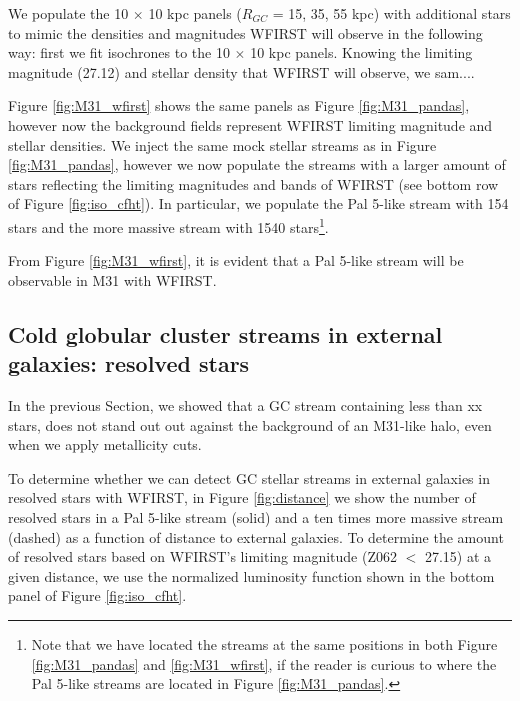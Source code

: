 \documentclass[twocolumn]{aastex62}
\begin{document}
We populate the 10 $\times$ 10 kpc panels ($R_{GC}$ = 15, 35, 55 kpc) with  additional stars to mimic the densities and magnitudes WFIRST will observe in the following way: first we fit isochrones to the 10 $\times$ 10 kpc panels. Knowing the limiting magnitude (27.12) and stellar density that  WFIRST will observe, we sam....

Figure \ref{fig:M31_wfirst} shows the same panels as Figure \ref{fig:M31_pandas}, however now the background fields represent WFIRST limiting magnitude and stellar densities. We inject the same mock stellar streams as in Figure \ref{fig:M31_pandas}, however we now populate the streams with a larger amount of stars reflecting the limiting magnitudes and bands of WFIRST (see bottom row of Figure \ref{fig:iso_cfht}). In particular, we populate the Pal 5-like stream with 154 stars and the more massive stream with 1540 stars\footnote{Note that we have located the streams at the same positions in both Figure \ref{fig:M31_pandas} and \ref{fig:M31_wfirst}, if the reader is curious to where the Pal 5-like streams are located in Figure  \ref{fig:M31_pandas}.}.

From Figure \ref{fig:M31_wfirst}, it is evident that a Pal 5-like stream will be observable in M31 with WFIRST. 



\subsection{Cold globular cluster streams in external galaxies: resolved stars}
\label{sec:resother}
In the previous Section, we showed that a GC stream containing less than xx stars, does not stand out out against the background of an M31-like halo, even when we apply metallicity cuts. 

To determine whether we can detect GC stellar streams in external galaxies in resolved stars with WFIRST, in Figure \ref{fig:distance} we show the number of resolved stars in a Pal 5-like stream (solid) and a ten times more massive stream (dashed) as a function of distance to external galaxies. To determine the amount of resolved stars based on WFIRST's limiting magnitude (Z062 $<$ 27.15) at a given distance, we use the normalized luminosity function shown in the bottom panel of Figure \ref{fig:iso_cfht}.
\end{document}
